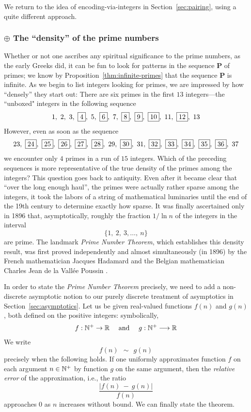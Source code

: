 \smallskip

We return to the idea of encoding-via-integers in Section~\ref{sec:pairing}, using a quite different approach.

\subsubsection{$\oplus$ The ``density'' of the prime numbers}
\label{sec:prime-density}

Whether or not one ascribes any spiritual significance to the prime numbers, as the early Greeks did, it can be fun to look for patterns in the sequence {\bf P} of primes; we know by Proposition~\ref{thm:infinite-primes} that the sequence {\bf P} is infinite.  As we begin to list integers looking for primes, we are impressed by how ``densely'' they start out:  There are six primes in the first $13$ integers---the ``unboxed" integers in the following sequence
\[ 
1, \ 2, \ 3, \ \fbox{4}, \ 5, \ \fbox{6}, \ 7, \ \fbox{8}, \ \fbox{9}, \ \fbox{10}, \ 11, \ \fbox{12}, \ 13 
\] 
However, even as soon as the sequence
\[ 23, \ \fbox{24}, \ \fbox{25}, \ \fbox{26}, \ \fbox{27}, \ \fbox{28}, \ 29, \ \fbox{30}, \ 31, 
\ \fbox{32}, \ \fbox{33}, \ \fbox{34}, \ \fbox{35}, \ \fbox{36}, \ 37
\]
we encounter only $4$ primes in a run of $15$ integers.  Which of the preceding sequences is more representative of the true density of the primes among the integers?  This question goes back to antiquity.  Even after it became clear that ``over the long enough haul'', the primes were actually rather sparse among the integers, it took the labors of a string of mathematical luminaries until the  end of the 19th century to determine exactly how sparse.  It was finally ascertained only in 1896 that, asymptotically, roughly the fraction $1/ \ln n$ of the integers in the interval
\[ \{ 1, \ 2, \ 3, \ldots, \ n \} \]
are prime.  The landmark {\it Prime Number Theorem}, which establishes this density result, was first proved independently and almost simultaneously (in 1896) by the French mathematician Jacques Hadamard  \cite{Hadamard} and the Belgian mathematician Charles Jean de la Vall\'{e}e Poussin \cite{Poussin}.
 

\smallskip

In order to state the {\it Prime Number Theorem} precisely, we need to add a non-discrete asymptotic notion to our purely discrete treatment of asymptotics in Section~\ref{sec:asymptotics}.  Let us be given real-valued functions $f(n)$ and $g(n)$, both defined on the positive integers: symbolically,
\[
f: \mathbb{N}^+ \rightarrow  \mathbb{R} \ \ \ \mbox{ and } \ \ \
g: \mathbb{N}^+ \longrightarrow  \mathbb{R}
\]
We write
\[ f(n) \ \ \sim \ \ g(n) \]
precisely when the following holds.  If one uniformly approximates function $f$ on each argument $n \in \mathbb{N}^+$ by function $g$ on the same argument, then the {\it relative error} of the approximation, i.e., the ratio
\[ \frac{|f(n) \ - \ g(n)|}{f(n)} \]
approaches $0$ as $n$ increases without bound.  We can finally state the theorem.
\index{approximation, relative error}

